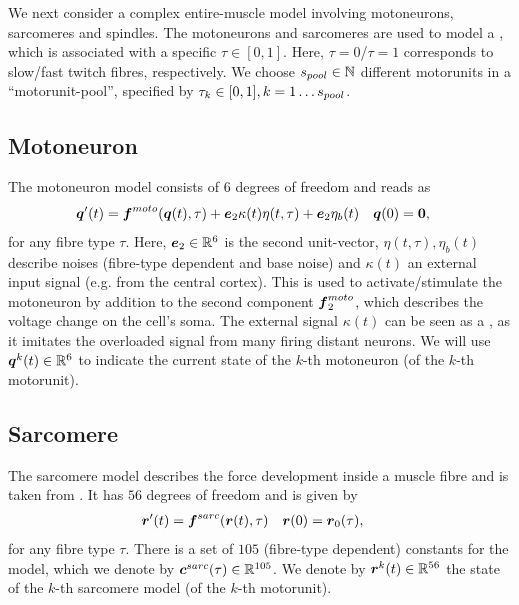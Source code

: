 We next consider a complex entire-muscle model involving motoneurons, sarcomeres and spindles.
The motoneurons and sarcomeres are used to model a , which is associated with a specific  $\tau\in[0,1]$.
Here, $\tau=0$/$\tau=1$ corresponds to slow/fast twitch fibres, respectively.
We choose ${s_{pool}}\in \mathbb{N}$ different motorunits in a ``motorunit-pool'', specified by $\tau_k\in[0,1], k=1\ldots{s_{pool}}$.

\subsection{Motoneuron}
The motoneuron model \cite{Cisi2008, negro2011} consists of $6$ degrees of freedom and reads as
\begin{align}
	\boldsymbol{q}'(t) &= \boldsymbol{f}^{moto}(\boldsymbol{q}(t),\tau) + \boldsymbol{e}_2\kappa(t)\eta(t,\tau) + \boldsymbol{e}_2\eta_b(t) & \boldsymbol{q}(0) &= \boldsymbol{0},
\end{align}
for any fibre type $\tau$.
Here, $\boldsymbol{e}_2\in\mathbb{R}^6$ is the second unit-vector, $\eta(t,\tau),\eta_b(t)$ describe noises (fibre-type dependent and base noise)
and $\kappa(t)$ an external input signal (e.g. from the central cortex).
This is used to activate/stimulate the motoneuron by addition to the second component $\boldsymbol{f}^{moto}_2$, which describes the voltage change on the cell's soma.
The external signal $\kappa(t)$ can be seen as a , as it imitates the overloaded signal from many firing distant neurons.
We will use $\boldsymbol{q}^k(t) \in \mathbb{R}^6$ to indicate the current state of the $k$-th motoneuron (of the $k$-th motorunit).


\subsection{Sarcomere}
The sarcomere model describes the force development inside a muscle fibre and is taken from \cite{Shorten2007}.
It has $56$ degrees of freedom and is given by
\begin{align}
	\boldsymbol{r}'(t) &= \boldsymbol{f}^{sarc}(\boldsymbol{r}(t),\tau) & \boldsymbol{r}(0) &= \boldsymbol{r}_0(\tau),
\end{align}
for any fibre type $\tau$.
There is a set of $105$ (fibre-type dependent) constants for the model, which we denote by $\boldsymbol{c}^{sarc}(\tau)\in\mathbb{R}^{105}$.
We denote by $\boldsymbol{r}^k(t)\in\mathbb{R}^{56}$ the state of the $k$-th sarcomere model (of the $k$-th motorunit).

